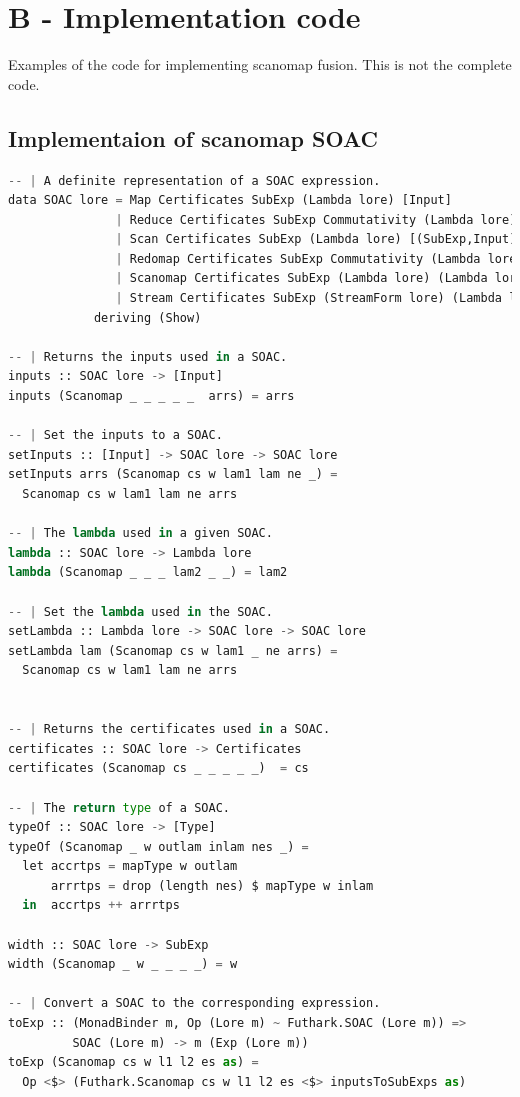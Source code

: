 \documentclass[11pt]{article}
\begin{document}
\newpage
\section{B - Implementation code}
Examples of the code for implementing scanomap fusion. This is not the complete code.

\subsection{Implementaion of scanomap SOAC}

\begin{lstlisting}[language=Python,caption=Implementing scanomap as SOAC] 
-- | A definite representation of a SOAC expression.
data SOAC lore = Map Certificates SubExp (Lambda lore) [Input]
               | Reduce Certificates SubExp Commutativity (Lambda lore) [(SubExp,Input)]
               | Scan Certificates SubExp (Lambda lore) [(SubExp,Input)]
               | Redomap Certificates SubExp Commutativity (Lambda lore) (Lambda lore) [SubExp] [Input]
               | Scanomap Certificates SubExp (Lambda lore) (Lambda lore) [SubExp] [Input]
               | Stream Certificates SubExp (StreamForm lore) (Lambda lore) [Input]
            deriving (Show)
            
-- | Returns the inputs used in a SOAC.
inputs :: SOAC lore -> [Input]
inputs (Scanomap _ _ _ _ _  arrs) = arrs

-- | Set the inputs to a SOAC.
setInputs :: [Input] -> SOAC lore -> SOAC lore
setInputs arrs (Scanomap cs w lam1 lam ne _) =
  Scanomap cs w lam1 lam ne arrs
  
-- | The lambda used in a given SOAC.
lambda :: SOAC lore -> Lambda lore
lambda (Scanomap _ _ _ lam2 _ _) = lam2

-- | Set the lambda used in the SOAC.
setLambda :: Lambda lore -> SOAC lore -> SOAC lore
setLambda lam (Scanomap cs w lam1 _ ne arrs) =
  Scanomap cs w lam1 lam ne arrs


-- | Returns the certificates used in a SOAC.
certificates :: SOAC lore -> Certificates
certificates (Scanomap cs _ _ _ _ _)  = cs

-- | The return type of a SOAC.
typeOf :: SOAC lore -> [Type]
typeOf (Scanomap _ w outlam inlam nes _) =
  let accrtps = mapType w outlam
      arrrtps = drop (length nes) $ mapType w inlam
  in  accrtps ++ arrrtps

width :: SOAC lore -> SubExp
width (Scanomap _ w _ _ _ _) = w

-- | Convert a SOAC to the corresponding expression.
toExp :: (MonadBinder m, Op (Lore m) ~ Futhark.SOAC (Lore m)) =>
         SOAC (Lore m) -> m (Exp (Lore m))
toExp (Scanomap cs w l1 l2 es as) =
  Op <$> (Futhark.Scanomap cs w l1 l2 es <$> inputsToSubExps as)


\end{lstlisting}
\end{document}
